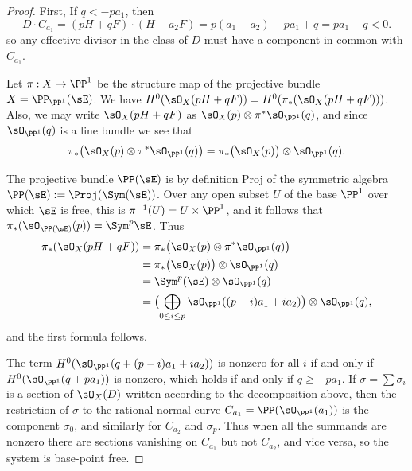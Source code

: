 \begin{proof} First, If $q<-pa_{1}$, then 
$$
D\cdot C_{a_{1}} = (pH+qF) \cdot (H-a_{2}F) = p(a_{1}+a_{2}) -pa_{1}+q = pa_{1}+q < 0.
$$
so any effective divisor in the class of $D$ must have a component in common with $C_{a_{1}}$.

Let $\pi:X\to \PP^{1}$ be the structure map of the projective bundle $X = \PP_{\PP^{1}}(\sE)$.
We have $H^{0}(\sO_{X}(pH+qF)) = H^{0}(\pi_{*}(\sO_{X}(pH+qF)))$. Also, 
we may write $\sO_{X}(pH+qF)$ as $\sO_{X}(p) \otimes \pi^{*}\sO_{\PP^{1}}(q)$, and since
$\sO_{\PP^{1}}(q)$ is a line bundle we see that 
$$
\pi_{*}\bigl(\sO_{X}(p) \otimes \pi^{*}\sO_{\PP^{1}}(q)\bigr) 
 = \pi_{*}\bigl(\sO_{X}(p)\bigr)\otimes \sO_{\PP^{1}}(q).
$$

The projective bundle $\PP(\sE)$ is
by definition Proj of the symmetric algebra $\PP(\sE):=\Proj(\Sym(\sE))$. Over any open 
subset $U$ of the base $\PP^1$ over which $\sE$ is free, this is $\pi^{-1}(U) = U\times \PP^1$,
and it follows that $\pi_*(\sO_{\PP(\sE)}(p)) = \Sym^p\sE$. 
Thus 
\begin{align*}
\pi_{*}(\sO_{X}(pH+qF)) &= 
\pi_{*}\bigl(\sO_{X}(p) \otimes \pi^{*}\sO_{\PP^{1}}(q)\bigr) \\
 &= \pi_{*}\bigl(\sO_{X}(p)\bigr)\otimes \sO_{\PP^{1}}(q)\\
&=  \Sym^{p}(\sE)\otimes \sO_{\PP^{1}}(q)\\
&=  \bigl(\bigoplus_{0\leq i\leq p} \sO_{\PP^{1}}((p-i)a_{1}+i a_{2})\bigr) \otimes \sO_{\PP^{1}}(q),
\end{align*}
and the first formula follows. 

The term 
$H^{0}(\sO_{\PP^{1}}(q + (p-i)a_{1}+i a_{2}))$ is nonzero for all $i$ if and only if 
$H^{0}(\sO_{\PP^{1}}(q + pa_{1}))$ is nonzero, which holds if and only if $q\geq -pa_{1}$.
If $\sigma = \sum \sigma_i$ is a section of $\sO_X(D)$ written according to the decomposition
above, then the restriction of $\sigma$ to  the rational normal curve $C_{a_1} = \PP(\sO_{\PP^1}(a_1))$ is the component $\sigma_0$, and similarly for $C_{a_2}$ and $\sigma_p$. Thus when  all the summands are nonzero
there are sections  vanishing on $C_{a_{1}}$ but not $C_{a_{2}}$, and vice versa, so the system is base-point free. 
\end{proof}




